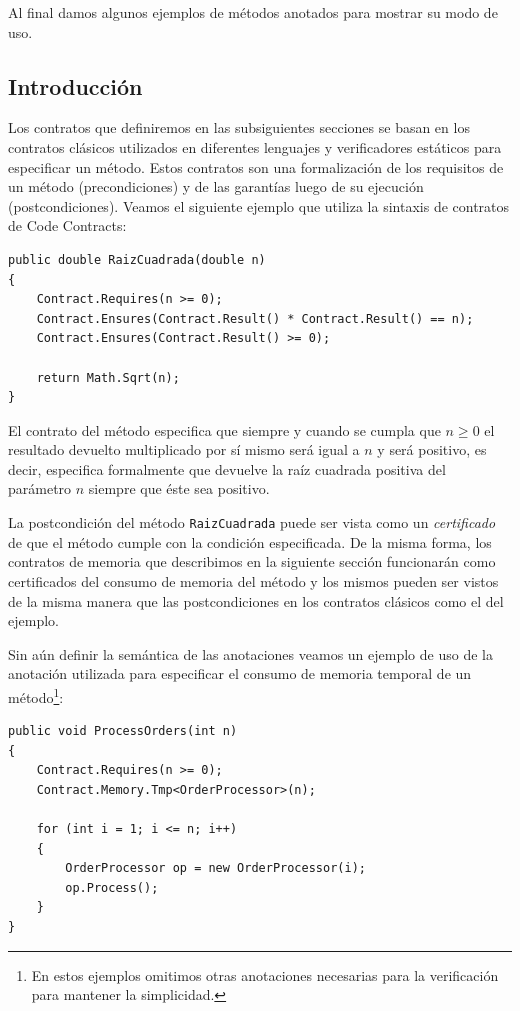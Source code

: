 \documentclass[12pt,a4paper]{article}
\newcommand\mono[1]{\texttt{#1}}
\begin{document}
		Al final damos algunos ejemplos de métodos anotados para mostrar su modo de uso.

		\subsection{Introducción}
			Los contratos que definiremos en las subsiguientes secciones se basan en los contratos clásicos utilizados en diferentes lenguajes y verificadores estáticos para especificar un método. Estos contratos son una formalización de los requisitos de un método (precondiciones) y de las garantías luego de su ejecución (postcondiciones). Veamos el siguiente ejemplo que utiliza la sintaxis de contratos de Code Contracts:

			\vspace{15pt}
			\begin{small}
			\begin{lstlisting}[caption=Ejemplo de método con contratos de Code Contracts]
public double RaizCuadrada(double n)
{
	Contract.Requires(n >= 0);
	Contract.Ensures(Contract.Result() * Contract.Result() == n);
	Contract.Ensures(Contract.Result() >= 0);

	return Math.Sqrt(n);
}
			\end{lstlisting}
			\end{small}

			El contrato del método especifica que siempre y cuando se cumpla que $n \geq 0$ el resultado devuelto multiplicado por sí mismo será igual a $n$ y será positivo, es decir, especifica formalmente que devuelve la raíz cuadrada positiva del parámetro $n$ siempre que éste sea positivo.

			La postcondición del método \mono{RaizCuadrada} puede ser vista como un \textit{certificado} de que el método cumple con la condición especificada. De la misma forma, los contratos de memoria que describimos en la siguiente sección funcionarán como certificados del consumo de memoria del método y los mismos pueden ser vistos de la misma manera que las postcondiciones en los contratos clásicos como el del ejemplo.

			Sin aún definir la semántica de las anotaciones veamos un ejemplo de uso de la anotación utilizada para especificar el consumo de memoria temporal de un método\footnote{En estos ejemplos omitimos otras anotaciones necesarias para la verificación para mantener la simplicidad.}:

			\vspace{15pt}
			\begin{lstlisting}[caption=Ejemplo de contrato de memoria temporal]
public void ProcessOrders(int n)
{
	Contract.Requires(n >= 0);
	Contract.Memory.Tmp<OrderProcessor>(n);

	for (int i = 1; i <= n; i++)
	{
		OrderProcessor op = new OrderProcessor(i);
		op.Process();
	}
}
			\end{lstlisting}
\end{document}
